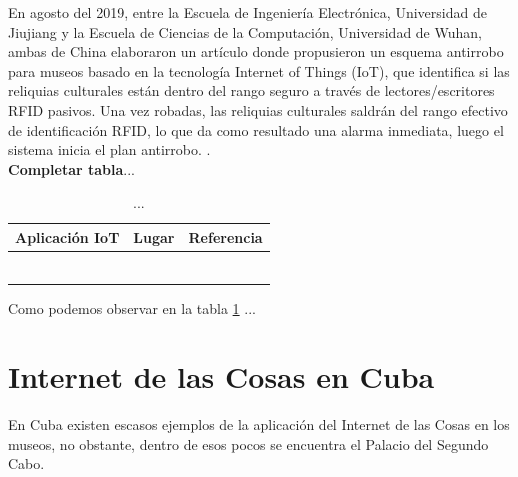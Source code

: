         En agosto del 2019, entre la Escuela de Ingeniería Electrónica, Universidad de Jiujiang y la Escuela de Ciencias de la Computación, Universidad de Wuhan, ambas de China elaboraron un artículo donde propusieron un esquema antirrobo para museos basado en la tecnología Internet of Things (IoT), que identifica si las reliquias culturales están dentro del rango seguro a través de lectores/escritores RFID pasivos. Una vez robadas, las reliquias culturales saldrán del rango efectivo de identificación RFID, lo que da como resultado una alarma inmediata, luego el sistema inicia el plan antirrobo. \cite{chinaSistemaSeguridadRFID}.\\

        \textbf{Completar tabla}...

        \begin{table}[h]
            \begin{center}
                \begin{tabular}{|l|l|l|}
                \hline
                Aplicación IoT & Lugar & Referencia \\ \hline
                             &       &            \\
                             &       &            \\
                             &       &            \\
                             &       &            \\
                             &       &            \\
                             &       &           
                \end{tabular}
            \end{center}
            \caption{...}
                \label{tab: relacion_autores}
        \end{table}

        Como podemos observar en la tabla \ref{tab: relacion_autores} ...
        

    \section{Internet de las Cosas en Cuba}\label{sec:iotCuba} 
        En Cuba existen escasos ejemplos de la aplicación del Internet de las Cosas en los museos, no obstante, dentro de esos pocos se encuentra el Palacio del Segundo Cabo.\\
        
